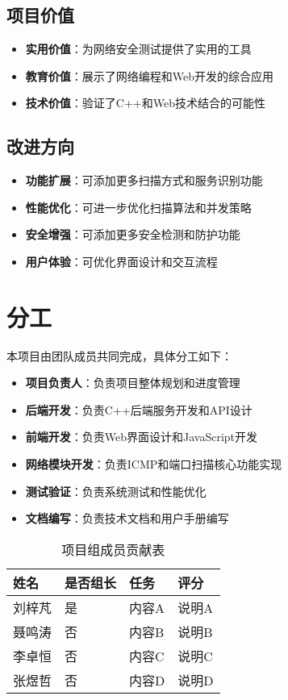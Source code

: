 \documentclass[12pt,hyperref,a4paper,UTF8]{ctexart}
\begin{document}
\subsection{项目价值}
\begin{itemize}
    \item \textbf{实用价值}：为网络安全测试提供了实用的工具
    \item \textbf{教育价值}：展示了网络编程和Web开发的综合应用
    \item \textbf{技术价值}：验证了C++和Web技术结合的可能性
\end{itemize}

\subsection{改进方向}
\begin{itemize}
    \item \textbf{功能扩展}：可添加更多扫描方式和服务识别功能
    \item \textbf{性能优化}：可进一步优化扫描算法和并发策略
    \item \textbf{安全增强}：可添加更多安全检测和防护功能
    \item \textbf{用户体验}：可优化界面设计和交互流程
\end{itemize}

\section{分工}

本项目由团队成员共同完成，具体分工如下：

\begin{itemize}
    \item \textbf{项目负责人}：负责项目整体规划和进度管理
    \item \textbf{后端开发}：负责C++后端服务开发和API设计
    \item \textbf{前端开发}：负责Web界面设计和JavaScript开发
    \item \textbf{网络模块开发}：负责ICMP和端口扫描核心功能实现
    \item \textbf{测试验证}：负责系统测试和性能优化
    \item \textbf{文档编写}：负责技术文档和用户手册编写
\end{itemize}


\begin{table}[H]
\centering
\renewcommand{\arraystretch}{1.3} %
\setlength{\tabcolsep}{18pt}      %
\begin{tabular}{|p{3cm}|p{2cm}|p{5cm}|p{3cm}|}
\hline
姓名 & 是否组长 & 任务 & 评分 \\
\hline
刘梓芃 & 是 & 内容A & 说明A \\
\hline
聂鸣涛 & 否 & 内容B & 说明B \\
\hline
李卓恒 & 否 & 内容C & 说明C \\
\hline
张煜哲 & 否 & 内容D & 说明D \\
\hline
\end{tabular}
\caption{项目组成员贡献表}
\end{table}

\end{document}
